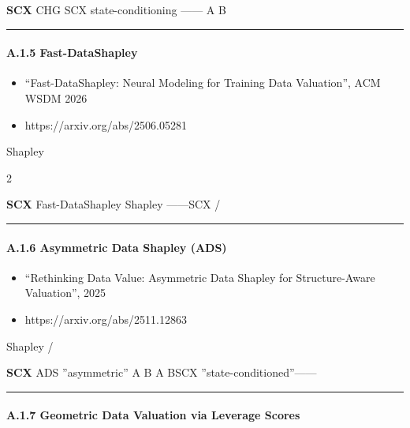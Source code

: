 \documentclass[
  12pt,
]{article}
\providecommand{\tightlist}{%
  \setlength{\itemsep}{0pt}\setlength{\parskip}{0pt}}
\begin{document}
\textbf{SCX }CHG SCX  state-conditioning
------ A  B


\begin{center}\rule{0.5\linewidth}{0.5pt}\end{center}

\paragraph{A.1.5 Fast-DataShapley}\label{a.1.5-fast-datashapley}

\begin{itemize}
\tightlist
\item
  \textbf{}``Fast-DataShapley: Neural Modeling for Training Data
  Valuation'', ACM WSDM 2026
\item
  \textbf{}https://arxiv.org/abs/2506.05281
\end{itemize}

\textbf{} Shapley


\textbf{}2 

\textbf{SCX }Fast-DataShapley  Shapley
\textbf{}------SCX
\textbf{}/

\begin{center}\rule{0.5\linewidth}{0.5pt}\end{center}

\paragraph{A.1.6 Asymmetric Data Shapley
(ADS)}\label{a.1.6-asymmetric-data-shapley-ads}

\begin{itemize}
\tightlist
\item
  \textbf{}``Rethinking Data Value: Asymmetric Data Shapley for
  Structure-Aware Valuation'', 2025
\item
  \textbf{}https://arxiv.org/abs/2511.12863
\end{itemize}

\textbf{} Shapley
/

\textbf{}

\textbf{SCX }ADS ''asymmetric'' A
 B  A  BSCX
''state-conditioned''------

\begin{center}\rule{0.5\linewidth}{0.5pt}\end{center}

\paragraph{A.1.7 Geometric Data Valuation via Leverage
Scores}\label{a.1.7-geometric-data-valuation-via-leverage-scores}
\end{document}
